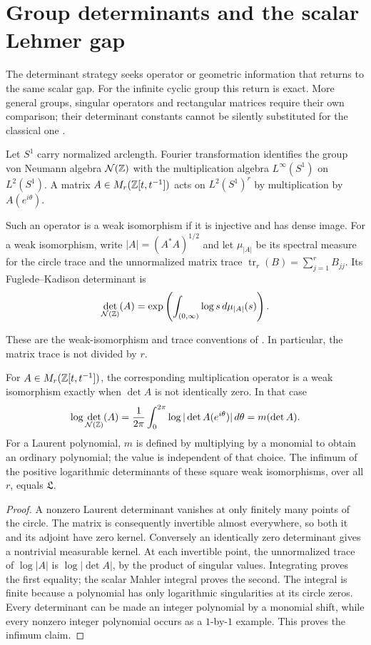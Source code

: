 \section{Group determinants and the scalar Lehmer gap}\label{sec:determinants}

The determinant strategy seeks operator or geometric information that returns to the same scalar gap.
For the infinite cyclic group this return is exact.
More general groups, singular operators and rectangular matrices require their own comparison; their determinant constants cannot be silently substituted for the classical one \cite{Luc22}.

Let $S^1$ carry normalized arclength.
Fourier transformation identifies the group von Neumann algebra $\mathcal N(\mathbb Z)$ with the multiplication algebra $L^\infty(S^1)$ on $L^2(S^1)$.
A matrix $A\in M_r(\mathbb Z[t,t^{-1}])$ acts on $L^2(S^1)^r$ by multiplication by $A(e^{i\theta})$.

\begin{definition}
Such an operator is a weak isomorphism if it is injective and has dense image.
For a weak isomorphism, write $|A|=(A^*A)^{1/2}$ and let $\mu_{|A|}$ be its spectral measure for the circle trace and the unnormalized matrix trace $\operatorname{tr}_r(B)=\sum_{j=1}^rB_{jj}$.
Its Fuglede--Kadison determinant is
\[
 \det_{\mathcal N(\mathbb Z)}(A)
   =\exp\left(\int_{(0,\infty)}\log s\,d\mu_{|A|}(s)\right).
\]
\end{definition}
These are the weak-isomorphism and trace conventions of \citet{Luc22}.
In particular, the matrix trace is not divided by $r$.

\begin{proposition}\label{det:scalar-return}
For $A\in M_r(\mathbb Z[t,t^{-1}])$, the corresponding multiplication operator is a weak isomorphism exactly when $\det A$ is not identically zero.
In that case
\[
 \log\det_{\mathcal N(\mathbb Z)}(A)
  =\frac1{2\pi}\int_0^{2\pi}\log|\det A(e^{i\theta})|\,d\theta
  =m(\det A).
\]
For a Laurent polynomial, $m$ is defined by multiplying by a monomial to obtain an ordinary polynomial; the value is independent of that choice.
The infimum of the positive logarithmic determinants of these square weak isomorphisms, over all $r$, equals $\mathfrak L$.
\end{proposition}
\begin{proof}
A nonzero Laurent determinant vanishes at only finitely many points of the circle.
The matrix is consequently invertible almost everywhere, so both it and its adjoint have zero kernel.
Conversely an identically zero determinant gives a nontrivial measurable kernel.
At each invertible point, the unnormalized trace of $\log|A|$ is $\log|\det A|$, by the product of singular values.
Integrating proves the first equality; the scalar Mahler integral proves the second.
The integral is finite because a polynomial has only logarithmic singularities at its circle zeros.
Every determinant can be made an integer polynomial by a monomial shift, while every nonzero integer polynomial occurs as a $1$-by-$1$ example.
This proves the infimum claim.
\end{proof}

